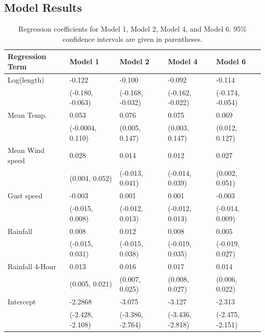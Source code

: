 \documentclass[]{article}
\begin{document}
\subsection{Model Results}\label{model-results}

\begin{table}[htb]
\centering
\def\arraystretch{1.3}
\caption[Regression coefficients for Models 1, 2, 4, and 6.]{Regression coefficients for Model 1, Model 2, Model 4, and Model 6. 
95\% confidence intervals are given in parentheses.\label{tab:modelcoef}}
\begin{tabular}{lllll}
\toprule
 Regression Term &  Model 1 &  Model 2 &  Model 4 & Model 6\\
\midrule
Log(length) & -0.122 & -0.100 & -0.092 & -0.114\\
& \footnotesize (-0.180, -0.063) & \footnotesize (-0.168, -0.032) & 
\footnotesize (-0.162, -0.022) & \footnotesize (-0.174, -0.054)\\
Mean Temp. & 0.053 &  0.076 & 0.075 & 0.069\\
& \footnotesize (-0.0004, 0.110) & \footnotesize (0.005, 0.147) & 
\footnotesize (0.003, 0.147)  & \footnotesize (0.012, 0.127)\\
Mean Wind speed & 0.028 & 0.014 & 0.012 & 0.027\\
& \footnotesize (0.004, 0.052) & \footnotesize (-0.013, 0.041) & 
\footnotesize (-0.014, 0.039) & \footnotesize (0.002, 0.051)\\
Gust speed & -0.003 & 0.001 & 0.001 & -0.003\\
& \footnotesize (-0.015, 0.008) & \footnotesize (-0.012, 0.013) & 
\footnotesize (-0.012, 0.013) & \footnotesize (-0.014, 0.009)\\
Rainfall & 0.008 & 0.012 & 0.008 & 0.005\\
& \footnotesize (-0.015, 0.031) & \footnotesize (-0.015, 0.038) & 
\footnotesize (-0.019, 0.035) & \footnotesize (-0.019, 0.027)\\
Rainfall 4-Hour & 0.013 & 0.016 & 0.017 & 0.014\\
& \footnotesize (0.005, 0.021) & \footnotesize (0.007, 0.025) &
\footnotesize (0.008, 0.027) & \footnotesize (0.006, 0.022)\\
Intercept & -2.2868 & -3.075 & -3.127 & -2.313\\
& \footnotesize (-2.428, -2.108) & \footnotesize (-3.386, -2.764) &
\footnotesize (-3.436, -2.818) & \footnotesize (-2.475, -2.151)\\ 
\bottomrule
\end{tabular}
\end{table}
\end{document}
